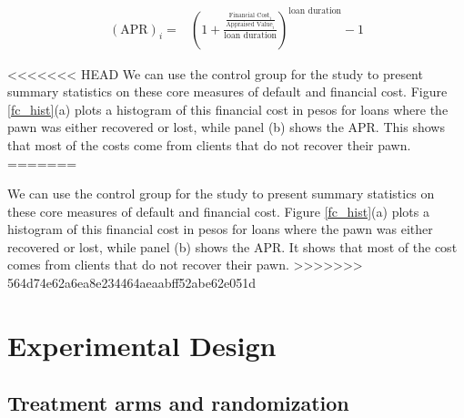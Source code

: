 \documentclass[oneside,11pt]{article}
\begin{document}
\begin{align*}
    (\text{APR})_i =&\left( 1 + \frac{\frac{\text{Financial Cost}_i}{\text{Appraised Value}_i}}{\text{loan duration}}\right)^{\text{loan duration}}-1 
\end{align*}

<<<<<<< HEAD
We can use the control group for the study to present summary statistics on these core measures of default and financial cost.   Figure \ref{fc_hist}(a) plots a histogram of this financial cost in pesos for loans where the pawn was either recovered or lost, while panel (b) shows the APR. This shows that most of the costs come from clients that do not recover their pawn. 
=======


We can use the control group for the study to present summary statistics on these core measures of default and financial cost.   Figure \ref{fc_hist}(a) plots a histogram of this financial cost in pesos for loans where the pawn was either recovered or lost, while panel (b) shows the APR. It shows that most of the cost comes from clients that do not recover their pawn. 
>>>>>>> 564d74e62a6ea8e234464aeaabff52abe62e051d





\section{Experimental Design} \label{Experiment}

\subsection{Treatment arms and randomization}
\end{document}
